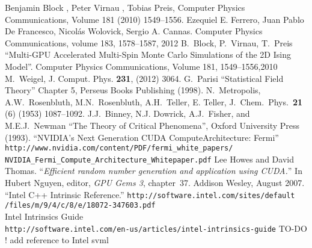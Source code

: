 \documentclass[a4paper]{llncs}
\begin{document}
\begin{thebibliography}{9}
Benjamin Block , Peter Virnau , Tobias Preis, Computer Physics Communications, Volume 181 (2010) 1549–1556.
Ezequiel E. Ferrero, Juan Pablo De Francesco, Nicolás Wolovick, Sergio A. Cannas. Computer Physics Communications, volume 183, 1578--1587, 2012
B.~Block, P.~Virnau, T.~Preis ``Multi-GPU Accelerated Multi-Spin Monte Carlo Simulations of the 2D Ising Model''. Computer Physics Communications, Volume 181, 1549--1556,2010
 M.~Weigel, J. Comput. Phys. \textbf{231},  (2012) 3064.
 G.~Parisi ``Statistical Field Theory'' Chapter 5, Perseus Books Publishing (1998).
N.~Metropolis, A.W.~Rosenbluth, M.N.~Rosenbluth, A.H.~Teller, E. Teller,
   J.~Chem.~Phys.~\textbf{21} (6) (1953) 1087--1092.
J.J.~Binney, N.J. Dowrick, A.J.~Fisher, and M.E.J.~Newman ``The Theory of Critical Phenomena'', Oxford University Press (1993).
``NVIDIA's Next Generation CUDA ComputeArchitecture: Fermi'' \\
\verb!http://www.nvidia.com/content/PDF/fermi_white_papers/!\\
\verb!NVIDIA_Fermi_Compute_Architecture_Whitepaper.pdf!
Lee Howes and David Thomas.
``{\em Efficient random number generation and application using {CUDA}.}''
In Hubert Nguyen, editor, {\em GPU Gems 3}, chapter~37. Addison
  Wesley, August 2007.
 ``Intel C++ Intrinsic Reference.''
\verb!http://software.intel.com/sites/default!\\\verb!/files/m/9/4/c/8/e/18072-347603.pdf! \\
Intel Intrinsics Guide\\ \verb!http://software.intel.com/en-us/articles/intel-intrinsics-guide!
 TO-DO ! add reference to Intel svml
\end{thebibliography}
\end{document}
